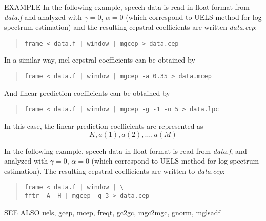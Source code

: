 \begin{qsection}{EXAMPLE}
In the following example, speech data is read in float format
from {\em data.f} and analyzed with $\gamma=0$, $\alpha=0$
(which correspond to UELS method for log spectrum estimation)
and the resulting cepstral coefficients are written {\em data.cep}:
\begin{quote}
  \verb!frame < data.f | window | mgcep > data.cep !
\end{quote}

In a similar way, mel-cepstral coefficients can be obtained by
\begin{quote}
 \verb!frame < data.f | window | mgcep -a 0.35 > data.mcep !
\end{quote}

And linear prediction coefficients can be obtained by
\begin{quote}
  \verb!frame < data.f | window | mgcep -g -1 -o 5 > data.lpc !
\end{quote}
In this case, the linear prediction coefficients are represented as
\begin{displaymath}
  K, a(1), a(2), \dots, a(M)
\end{displaymath}
\end{qsection}

In the following example, speech data in float format is read
from {\em data.f}, and analyzed with $\gamma=0$, $\alpha=0$
(which correspond to UELS method for log spectrum estimation).
The resulting cepstral coefficients are written to {\em data.cep}:
\begin{quote}
  \verb!frame < data.f | window | \! \\
  \verb!fftr -A -H | mgcep -q 3 > data.cep!
\end{quote}

\begin{qsection}{SEE ALSO}
\hyperlink{uels}{uels},
\hyperlink{gcep}{gcep},
\hyperlink{mcep}{mcep},
\hyperlink{freqt}{freqt},
\hyperlink{gc2gc}{gc2gc},
\hyperlink{mgc2mgc}{mgc2mgc},
\hyperlink{gnorm}{gnorm},
\hyperlink{mglsadf}{mglsadf}
\end{qsection}
